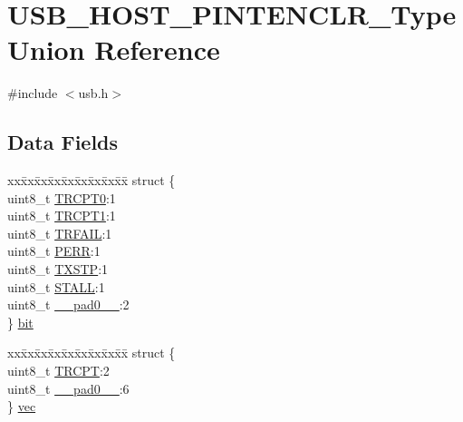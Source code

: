 \hypertarget{union_u_s_b___h_o_s_t___p_i_n_t_e_n_c_l_r___type}{}\section{U\+S\+B\+\_\+\+H\+O\+S\+T\+\_\+\+P\+I\+N\+T\+E\+N\+C\+L\+R\+\_\+\+Type Union Reference}
\label{union_u_s_b___h_o_s_t___p_i_n_t_e_n_c_l_r___type}


{\ttfamily \#include $<$usb.\+h$>$}

\subsection*{Data Fields}
\begin{DoxyCompactItemize}
\item 
\begin{tabbing}
xx\=xx\=xx\=xx\=xx\=xx\=xx\=xx\=xx\=\kill
struct \{\\
\>uint8\_t \mbox{\hyperlink{union_u_s_b___h_o_s_t___p_i_n_t_e_n_c_l_r___type_a7180d96a777e3568fd150aa959df6838}{TRCPT0}}:1\\
\>uint8\_t \mbox{\hyperlink{union_u_s_b___h_o_s_t___p_i_n_t_e_n_c_l_r___type_abfd778fdb9c052b995d0dabc9e75081b}{TRCPT1}}:1\\
\>uint8\_t \mbox{\hyperlink{union_u_s_b___h_o_s_t___p_i_n_t_e_n_c_l_r___type_a07aec3336bfd9ba5afd1e3ee3272fc96}{TRFAIL}}:1\\
\>uint8\_t \mbox{\hyperlink{union_u_s_b___h_o_s_t___p_i_n_t_e_n_c_l_r___type_abb41b7932a36f56f81f4531b37cbd1d1}{PERR}}:1\\
\>uint8\_t \mbox{\hyperlink{union_u_s_b___h_o_s_t___p_i_n_t_e_n_c_l_r___type_a12a45aab272091d34c3e30cf8aa046fe}{TXSTP}}:1\\
\>uint8\_t \mbox{\hyperlink{union_u_s_b___h_o_s_t___p_i_n_t_e_n_c_l_r___type_a3115e3c453036179abec9286cab08407}{STALL}}:1\\
\>uint8\_t \mbox{\hyperlink{union_u_s_b___h_o_s_t___p_i_n_t_e_n_c_l_r___type_a8b4eebe79ded0459acec2f4950102ba3}{\_\_pad0\_\_}}:2\\
\} \mbox{\hyperlink{union_u_s_b___h_o_s_t___p_i_n_t_e_n_c_l_r___type_a3a4130faebd93707c96c8efcdacd89c5}{bit}}\\

\end{tabbing}\item 
\begin{tabbing}
xx\=xx\=xx\=xx\=xx\=xx\=xx\=xx\=xx\=\kill
struct \{\\
\>uint8\_t \mbox{\hyperlink{union_u_s_b___h_o_s_t___p_i_n_t_e_n_c_l_r___type_a483e1559fa2eff15864d13c2f6fd29ae}{TRCPT}}:2\\
\>uint8\_t \mbox{\hyperlink{union_u_s_b___h_o_s_t___p_i_n_t_e_n_c_l_r___type_a8b4eebe79ded0459acec2f4950102ba3}{\_\_pad0\_\_}}:6\\
\} \mbox{\hyperlink{union_u_s_b___h_o_s_t___p_i_n_t_e_n_c_l_r___type_a4619dfc2fbe04343a69df85c287df990}{vec}}\\


\end{tabbing}
\end{DoxyCompactItemize}
